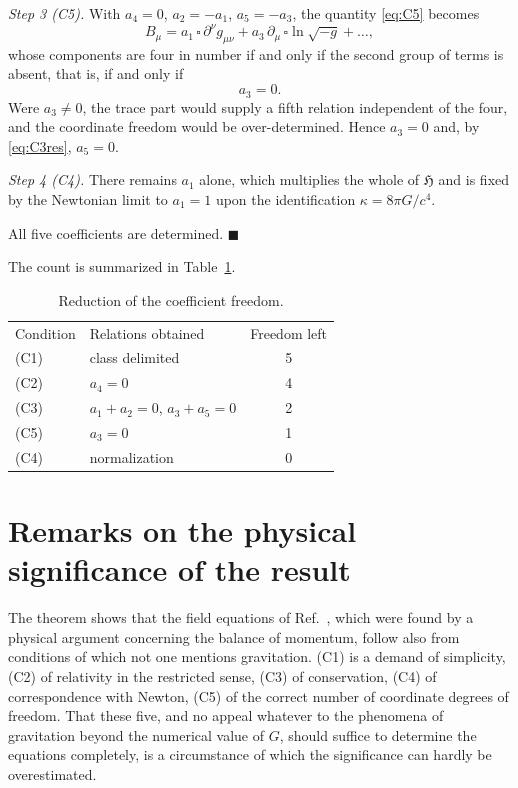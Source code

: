 \documentclass[aps,prd,reprint,amsmath,amssymb,nofootinbib,longbibliography]{revtex4-2}
\begin{document}
\emph{Step 3 (C5).} With $a_4 = 0$, $a_2 = -a_1$, $a_5 = -a_3$, the quantity \eqref{eq:C5} becomes
\begin{equation}
B_{\mu} = a_1\, \square\, \partial^{\nu} g_{\mu\nu}
        + a_3\, \partial_{\mu}\, \square \ln\sqrt{-g} + \dots ,
\end{equation}
whose components are four in number if and only if the second group of terms is absent, that is,
if and only if
\begin{equation}
a_3 = 0 .
\label{eq:a3}
\end{equation}
Were $a_3 \neq 0$, the trace part would supply a fifth relation independent of the four, and the
coordinate freedom would be over-determined. Hence $a_3 = 0$ and, by \eqref{eq:C3res}, $a_5 = 0$.

\emph{Step 4 (C4).} There remains $a_1$ alone, which multiplies the whole of $\mathfrak{H}$ and is
fixed by the Newtonian limit to $a_1 = 1$ upon the identification
$\kappa = 8\pi G/c^{4}$.

All five coefficients are determined. \hfill$\blacksquare$

\medskip

The count is summarized in Table~\ref{tab:count}.

\begin{table}[t]
\caption{Reduction of the coefficient freedom.}
\label{tab:count}
\begin{ruledtabular}
\begin{tabular}{llc}
Condition & Relations obtained & Freedom left \\
\colrule
(C1) & class delimited & 5 \\
(C2) & $a_4 = 0$ & 4 \\
(C3) & $a_1 + a_2 = 0$, $a_3 + a_5 = 0$ & 2 \\
(C5) & $a_3 = 0$ & 1 \\
(C4) & normalization & 0 \\
\end{tabular}
\end{ruledtabular}
\end{table}

\section{Remarks on the physical significance of the result}

The theorem shows that the field equations of Ref.~\cite{eingross1913}, which were found by a
physical argument concerning the balance of momentum, follow also from conditions of which not one
mentions gravitation. (C1) is a demand of simplicity, (C2) of relativity in the restricted sense,
(C3) of conservation, (C4) of correspondence with Newton, (C5) of the correct number of coordinate
degrees of freedom. That these five, and no appeal whatever to the phenomena of gravitation beyond
the numerical value of $G$, should suffice to determine the equations completely, is a circumstance
of which the significance can hardly be overestimated.
\end{document}
